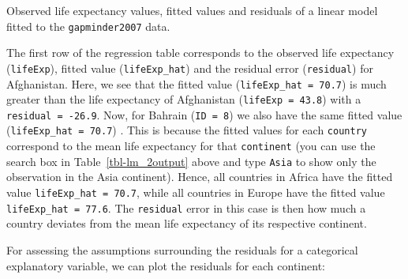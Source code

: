 \documentclass[
  letterpaper,
  DIV=11,
  numbers=noendperiod]{scrartcl}
\begin{document}
\begin{table}

\caption{\label{tbl-lm_2output}Observed life expectancy values, fitted
values and residuals of a linear model fitted to the
\texttt{gapminder2007} data.}


\end{table}%

The first row of the regression table corresponds to the observed life
expectancy (\texttt{lifeExp}), fitted value (\texttt{lifeExp\_hat}) and
the residual error (\texttt{residual}) for Afghanistan. Here, we see
that the fitted value (\texttt{lifeExp\_hat\ =\ 70.7}) is much greater
than the life expectancy of Afghanistan (\texttt{lifeExp\ =\ 43.8}) with
a \texttt{residual\ =\ -26.9}. Now, for Bahrain (\texttt{ID\ =\ 8}) we
also have the same fitted value (\texttt{lifeExp\_hat\ =\ 70.7}) . This
is because the fitted values for each \texttt{country} correspond to the
mean life expectancy for that \texttt{continent} (you can use the search
box in Table~\ref{tbl-lm_2output} above and type \texttt{Asia} to show
only the observation in the Asia continent). Hence, all countries in
Africa have the fitted value \texttt{lifeExp\_hat\ =\ 70.7}, while all
countries in Europe have the fitted value
\texttt{lifeExp\_hat\ =\ 77.6}. The \texttt{residual} error in this case
is then how much a country deviates from the mean life expectancy of its
respective continent.

For assessing the assumptions surrounding the residuals for a
categorical explanatory variable, we can plot the residuals for each
continent:
\end{document}
